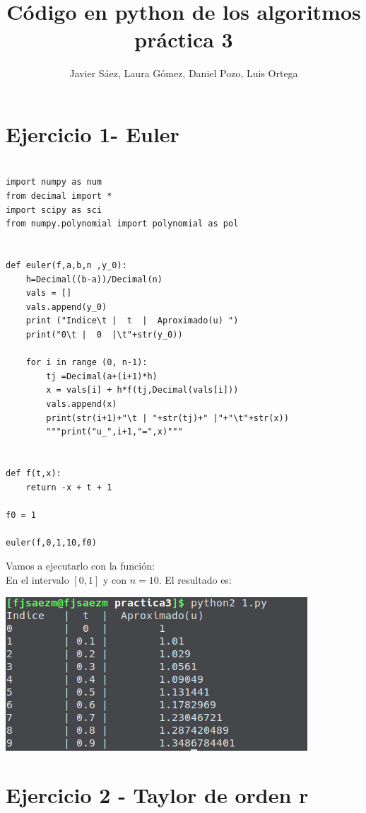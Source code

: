 \documentclass[11pt]{article}
\title{\textbf{Código en python de los algoritmos práctica 3}}
\author{Javier Sáez, Laura Gómez, Daniel Pozo, Luis Ortega}
\date{}
\begin{document}
\maketitle


\section{Ejercicio 1- Euler}
\begin{lstlisting}

import numpy as num
from decimal import *
import scipy as sci
from numpy.polynomial import polynomial as pol


def euler(f,a,b,n ,y_0):
    h=Decimal((b-a))/Decimal(n)
    vals = []
    vals.append(y_0)
    print ("Indice\t |  t  |  Aproximado(u) ")
    print("0\t |  0  |\t"+str(y_0)) 
    
    for i in range (0, n-1):
        tj =Decimal(a+(i+1)*h)
        x = vals[i] + h*f(tj,Decimal(vals[i]))
        vals.append(x)
        print(str(i+1)+"\t | "+str(tj)+" |"+"\t"+str(x))
        """print("u_",i+1,"=",x)"""


def f(t,x):
    return -x + t + 1

f0 = 1

euler(f,0,1,10,f0)
\end{lstlisting}
Vamos a ejecutarlo con la función:
\[

\]
En el intervalo $[0,1]$ y con $n=10$.
El resultado es:
\begin{center}
  \includegraphics[scale=0.4]{1.png}
\end{center}

\section{Ejercicio 2 - Taylor de orden r}
\end{document}
